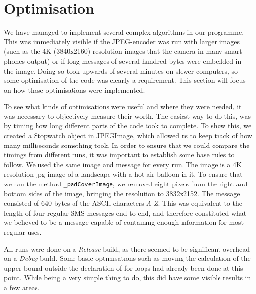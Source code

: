 \section{Optimisation}
We have managed to implement several complex algorithms in our programme.
This was immediately visible if the JPEG-encoder was run with larger images (such as the 4K (3840x2160) resolution images that the camera in many smart phones output) or if long messages of several hundred bytes were embedded in the image.
Doing so took upwards of several minutes on slower computers, so some optimisation of the code was clearly a requirement.
This section will focus on how these optimisations were implemented.
\vspace*{12pt}

To see what kinds of optimisations were useful and where they were needed, it was necessary to objectively measure their worth.
The easiest way to do this, was by timing how long different parts of the code took to complete.
To show this, we created a Stopwatch object in JPEGImage, which allowed us to keep track of how many milliseconds something took.
In order to ensure that we could compare the timings from different runs, it was important to establish some base rules to follow.
We used the same image and message for every run.
The image is a 4K resolution jpg image of a landscape with a hot air balloon in it.
To ensure that we ran the method \lstinline|_padCoverImage|, we removed eight pixels from the right and bottom sides of the image, bringing the resolution to 3832x2152.
The message consisted of 640 bytes of the ASCII characters \textit{A-Z}.
This was equivalent to the length of four regular SMS messages end-to-end, and therefore constituted what we believed to be a message capable of containing enough information for most regular uses.

All runs were done on a \textit{Release} build, as there seemed to be significant overhead on a \textit{Debug} build.
Some basic optimisations such as moving the calculation of the upper-bound outside the declaration of for-loops had already been done at this point.
While being a very simple thing to do, this did have some visible results in a few areas.

